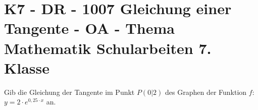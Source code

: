 \section{K7 - DR - 1007 Gleichung einer Tangente - OA - Thema Mathematik Schularbeiten 7. Klasse}

\begin{beispiel}[K7 - DR]{1} %
			Gib die Gleichung der Tangente im Punkt $P(0|2)$ des Graphen der Funktion $f$: $y=2\cdot e^{0,25\cdot x}$ an.
			
			\end{beispiel}
